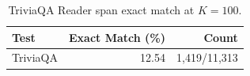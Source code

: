 \begin{table}[t]
\caption{TriviaQA Reader span exact match at $K=100$.}
\label{tab:spanem}
\centering
\footnotesize
\begin{tabular}{lrr}
\toprule
Test & Exact Match (\%) & Count \\
\midrule
TriviaQA & 12.54 & 1,419/11,313 \\
\bottomrule
\end{tabular}
\end{table}
